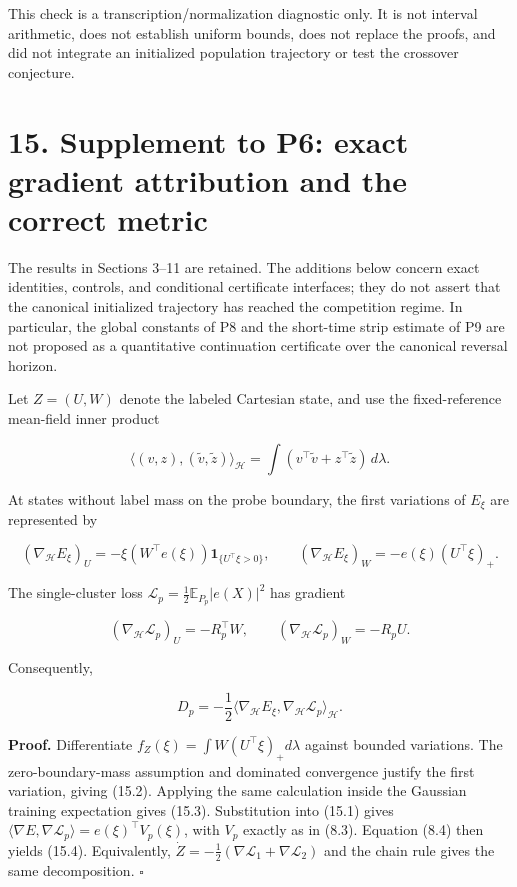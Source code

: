 \documentclass[
  10pt,
]{article}
\begin{document}
This check is a transcription/normalization diagnostic only. It is not
interval arithmetic, does not establish uniform bounds, does not replace
the proofs, and did not integrate an initialized population trajectory
or test the crossover conjecture.

\section{15. Supplement to P6: exact gradient attribution and the
correct
metric}\label{supplement-to-p6-exact-gradient-attribution-and-the-correct-metric}

The results in Sections 3--11 are retained. The additions below concern
exact identities, controls, and conditional certificate interfaces; they
do not assert that the canonical initialized trajectory has reached the
competition regime. In particular, the global constants of P8 and the
short-time strip estimate of P9 are not proposed as a quantitative
continuation certificate over the canonical reversal horizon.

Let \(Z=(U,W)\) denote the labeled Cartesian state, and use the
fixed-reference mean-field inner product

\[
 \langle (v,z),(\widetilde v,\widetilde z)\rangle_{\mathcal H}
 =\int(v^\top\widetilde v+z^\top\widetilde z)\,d\lambda.
 \tag{15.1}
\]

At states without label mass on the probe boundary, the first variations
of \(E_\xi\) are represented by

\[
 (\nabla_{\mathcal H}E_\xi)_U
 =-\xi(W^\top e(\xi))\mathbf1_{\{U^\top\xi>0\}},
 \qquad
 (\nabla_{\mathcal H}E_\xi)_W=-e(\xi)(U^\top\xi)_+.
 \tag{15.2}
\]

The single-cluster loss \(\mathcal L_p=\frac12\mathbb E_{P_p}|e(X)|^2\)
has gradient

\[
 (\nabla_{\mathcal H}\mathcal L_p)_U=-R_p^\top W,
 \qquad
 (\nabla_{\mathcal H}\mathcal L_p)_W=-R_pU.
 \tag{15.3}
\]

Consequently,

\[
 \boxed{D_p=-\frac12\langle\nabla_{\mathcal H}E_\xi,
                         \nabla_{\mathcal H}\mathcal L_p\rangle_{\mathcal H}.}
 \tag{15.4}
\]

\textbf{Proof.} Differentiate \(f_Z(\xi)=\int W(U^\top\xi)_+d\lambda\)
against bounded variations. The zero-boundary-mass assumption and
dominated convergence justify the first variation, giving (15.2).
Applying the same calculation inside the Gaussian training expectation
gives (15.3). Substitution into (15.1) gives
\(\langle\nabla E,\nabla\mathcal L_p\rangle=e(\xi)^\top V_p(\xi)\), with
\(V_p\) exactly as in (8.3). Equation (8.4) then yields (15.4).
Equivalently, \(\dot Z=-\frac12(\nabla\mathcal L_1+\nabla\mathcal L_2)\)
and the chain rule gives the same decomposition. \(\square\)
\end{document}
